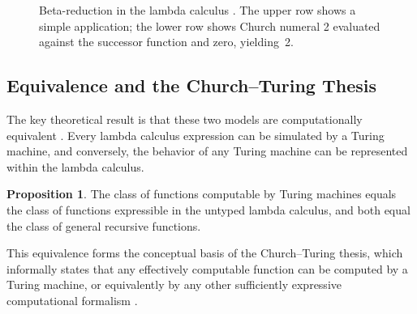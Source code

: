 \documentclass[11pt]{article}
\theoremstyle{definition}
\newtheorem{proposition}{Proposition}[section]
\begin{document}
\begin{figure}[h]
\centering
{}
\caption{Beta-reduction in the lambda calculus \cite{church1936}. The
upper row shows a simple application; the lower row shows Church numeral
2 evaluated against the successor function and zero, yielding~2.}
\label{fig:lambda}
\end{figure}

\subsection{Equivalence and the Church--Turing Thesis}

The key theoretical result is that these two models are computationally
equivalent \cite{kleene1952}. Every lambda calculus expression can be
simulated by a Turing machine, and conversely, the behavior of any
Turing machine can be represented within the lambda calculus.

\begin{proposition}
\label{prop:equiv}
The class of functions computable by Turing machines equals the class
of functions expressible in the untyped lambda calculus, and both equal
the class of general recursive functions.
\end{proposition}

This equivalence forms the conceptual basis of the Church--Turing thesis,
which informally states that any effectively computable function can be
computed by a Turing machine, or equivalently by any other sufficiently
expressive computational formalism \cite{kleene1952}.
\end{document}
